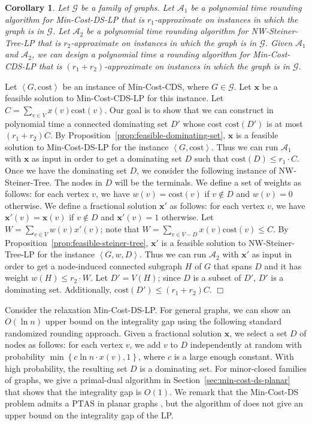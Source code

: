 \documentclass[11pt]{article}
\newtheorem{corollary}[lemma]{Corollary}
\renewenvironment{proof}{\vspace{-0.1in}\noindent{\bf Proof:}}{\hspace*{\fill}$\Box$\par}
\def\script#1{\mathcal{#1}}
\def\set#1{\left\{#1\right\}}
\def\pair#1{\left<#1\right>}
\def\sA{\script{A}}
\def\sG{\script{G}}
\def\prob#1{\textsf{\textup{#1}}\xspace}
\def\minDSlp{\prob{\minDS-LP}}
\def\minCDSlp{\prob{\minCDS-LP}}
\def\nwST{\prob{NW-Steiner-Tree}}
\def\nwSTlp{\prob{\nwST-LP}}
\def\PTAS{\mathrm{PTAS}}
\def\minCDS{\prob{Min-Cost-CDS}}
\def\minDS{\prob{Min-Cost-DS}}
\def\cost{\mathrm{cost}}
\def\vx{\mathrm{\mathbf{x}}}
\begin{document}
\begin{corollary}
	Let $\sG$ be a family of graphs.  Let $\sA_1$ be a polynomial
	time rounding algorithm for \minDSlp that is $r_1$-approximate
	on instances in which the graph is in $\sG$. Let
	$\sA_2$ be a polynomial time rounding algorithm for \nwSTlp that
	is $r_2$-approximate on instances in which the graph is in $\sG$.
	Given $\sA_1$ and $\sA_2$, we can design a
	polynomial time a rounding algorithm for \minCDSlp that is
	$(r_1 + r_2)$-approximate on instances in which the graph is in
	$\sG$.
\end{corollary}
\begin{proof}
	Let $\pair{G, \cost}$ be an instance of \minCDS, where $G \in
	\sG$. Let $\vx$ be a feasible solution to \minCDSlp for this
	instance. Let $C = \sum_{v \in V} x(v) \cost(v)$. Our goal is to
	show that we can construct in polynomial time a connected
	dominating set $D'$ whose cost $\cost(D')$ is at most
	$(r_1+r_2)C$. By Proposition~\ref{prop:feasible-dominating-set},
	$\vx$ is a feasible solution to \minDSlp for the instance
	$\pair{G, \cost}$.  Thus we can run $\sA_1$ with $\vx$ as input
	in order to get a dominating set $D$ such that $\cost(D) \leq r_1
	\cdotp C$. Once we have the dominating set $D$, we consider the
	following instance of \nwST. The nodes in $D$ will be the
	terminals. We define a set of weights as follows: for each vertex
	$v$, we have $w(v) = \cost(v)$ if $v \notin D$ and $w(v) = 0$
	otherwise. We define a fractional solution $\vx'$ as follows: for
	each vertex $v$, we have $\vx'(v) = \vx(v)$ if $v \notin D$ and
	$\vx'(v) = 1$ otherwise. Let $W = \sum_{v \in V} w(v) x'(v)$;
	note that $W = \sum_{v \in V-D} x(v) \cost(v) \leq C$. By
	Proposition~\ref{prop:feasible-steiner-tree}, $\vx'$ is a
	feasible solution to \nwSTlp for the instance $\pair{G, w, D}$.
	Thus we can run $\sA_2$ with $\vx'$ as input in order to get a
	node-induced connected subgraph $H$ of $G$ that spans $D$ and it
	has weight $w(H) \leq r_2 \cdotp W$. Let $D' = V(H)$; since $D$
	is a subset of $D'$, $D'$ is a dominating set. Additionally,
	$\cost(D') \leq (r_1 + r_2) C$.
\end{proof}

\medskip\noindent
Consider the relaxation \minDSlp. For general graphs, we can show an
$O(\ln{n})$ upper bound on the integrality gap using the following
standard randomized rounding approach. Given a fractional
solution $\vx$, we select a set $D$ of nodes as follows: for each
vertex $v$, we add $v$ to $D$ independently at random with
probability $\min\set{c\ln{n} \cdotp x(v), 1}$, where $c$ is a large
enough constant. With high probability, the resulting set $D$ is a
dominating set. For minor-closed families of graphs, we give a
primal-dual algorithm in Section~\ref{sec:min-cost-ds-planar} that
shows that the integrality gap is $O(1)$. We remark that the \minDS
problem admits a $\PTAS$ in planar graphs \cite{Baker94}, but the
algorithm of \cite{Baker94} does not give an upper bound on the
integrality gap of the LP.
\end{document}
